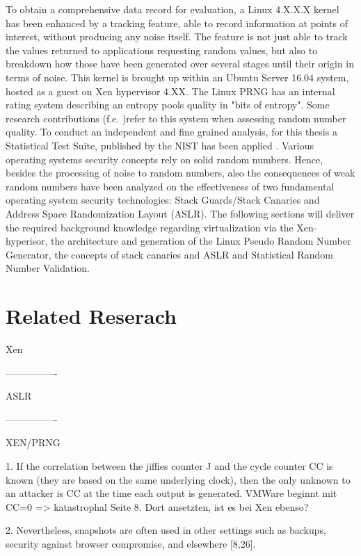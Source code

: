 To obtain a comprehensive data record for evaluation, a Linux 4.X.X.X kernel has been enhanced by a tracking feature, able to record information at points of interest, without producing any noise itself. The feature is not just able to track the values returned to applications requesting random values, but also to breakdown how those have been generated over several stages until their origin in terms of noise. This kernel is brought up within an Ubuntu Server 16.04 system, hosted as a guest on Xen hypervisor 4.XX. The Linux PRNG has an internal rating system describing an entropy pools quality in "bits of entropy". Some research contributions (f.e. \cite{lacharme2012linux})refer to this system when assessing random number quality. To conduct an independent and fine grained analysis, for this thesis a Statistical Test Suite, published by the NIST has been applied \cite{paul2016nist}. Various operating systems security concepts rely on solid random numbers. Hence, besides the processing of noise to random numbers, also the consequences of weak random numbers have been analyzed on the effectiveness of two fundamental operating system security technologies: Stack Guards/Stack Canaries and Address Space Randomization Layout (ASLR).
The following sections will deliver the required background knowledge regarding virtualization via the Xen-hyperisor, the architecture and generation of the Linux Pseudo Random Number Generator, the concepts of stack canaries and ASLR and Statistical Random Number Validation. 



\section{Related Reserach}

Xen

----------------

ASLR

----------------

XEN/PRNG

1.
If the correlation between the jiffies counter J and the cycle counter CC is known (they are based on the same underlying clock), then the only unknown to an attacker is CC at the time each output is generated. \cite{everspaugh2014not} VMWare beginnt mit CC=0 => katastrophal \cite{everspaugh2014not} Seite 8. Dort ansetzten, ist es bei Xen ebenso?


2.
Nevertheless, snapshots are often used
in other settings such as backups, security against browser
compromise, and elsewhere [8,26].
\cite{garfinkel2005virtual}


